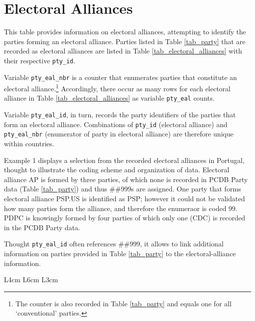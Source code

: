\section{Electoral Alliances}\label{sec_electoral_alliances}
This table provides information on electoral alliances, attempting to identify the parties forming an electoral alliance. Parties listed in Table \ref{tab_party} that are recorded as electoral alliances are listed in Table \ref{tab_electoral_alliances} with their respective \texttt{\footnotesize pty\_id}.

Variable \texttt{\footnotesize pty\_eal\_nbr} is a counter that enumerates parties that constitute an electoral alliance.\footnote{The counter is also recorded in Table \ref{tab_party} and equals one for all `conventional' parties.}
Accordingly, there occur as many rows for each electoral alliance in Table \ref{tab_electoral_alliances} as variable \texttt{\footnotesize pty\_eal} counts. 

Variable \texttt{\footnotesize pty\_eal\_id}, in turn, records the party identifiers of the parties that form an electoral alliance. Combinations of \texttt{\footnotesize pty\_id} (electoral alliance) and \texttt{\footnotesize pty\_eal\_nbr} (enumerator of party in electoral alliance) are therefore unique within countries.

\begin{table}[h!]
\centering\footnotesize
\caption*{Example 1: Composition of selected electoral alliances in Portugal.}

\end{table}

Example 1 displays a selection from the recorded electoral alliances in Portugal, thought to illustrate the coding scheme and organization of data. 
Electoral alliance AP is formed by three parties, of which none is recorded in PCDB Party data (Table \ref{tab_party}) and thus \#\#999s are assigned. One party that forms electoral alliance PSP.US is identified as PSP; however it could not be validated how many parties form the alliance, and therefore the enumeraor is coded 99.
PDPC is knowingly formed by four parties of which only one (CDC) is recorded in the PCDB Party data.

Thought \texttt{\footnotesize pty\_eal\_id} often references \#\#999, it allows to link additional information on parties provided in Table \ref{tab_party} to the electoral-alliance information. 

\begin{center}
\begin{longtable}{L{4cm} L{6cm} L{3cm}}
\caption{Variables in Electoral Alliances Table\label{tab_electoral_alliances}}


\end{longtable}
\end{center}
